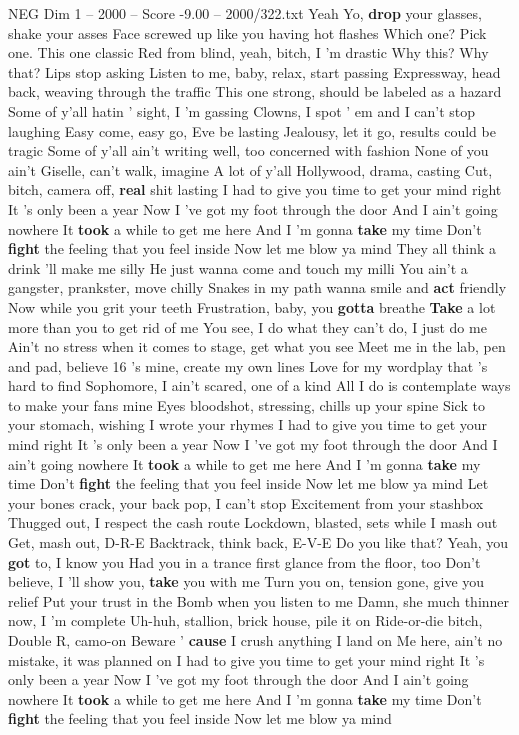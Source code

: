 \begin{textsample}{NEG Dim 1 – 2000 – Score -9.00 – 2000/322.txt}  \label{ex:f1_neg_013}
Yeah Yo, \textbf{drop} your glasses, shake your asses Face screwed up like you having hot flashes Which one?
Pick one.
This one classic Red from blind, yeah, bitch, I 'm drastic Why this?
Why that?
Lips stop asking Listen to me, baby, relax, start passing Expressway, head back, weaving through the traffic This one strong, should be labeled as a hazard Some of y'all hatin ' sight, I 'm gassing Clowns, I spot ' em and I can't stop laughing Easy come, easy go, Eve be lasting Jealousy, let it go, results could be tragic Some of y'all ain't writing well, too concerned with fashion None of you ain't Giselle, can't walk, imagine A lot of y'all Hollywood, drama, casting Cut, bitch, camera off, \textbf{real} shit lasting I had to give you time to get your mind right It 's only been a year Now I 've got my foot through the door And I ain't going nowhere It \textbf{took} a while to get me here And I 'm gonna \textbf{take} my time Don't \textbf{fight} the feeling that you feel inside Now let me blow ya mind They all think a drink 'll make me silly He just wanna come and touch my milli You ain't a gangster, prankster, move chilly Snakes in my path wanna smile and \textbf{act} friendly Now while you grit your teeth Frustration, baby, you \textbf{gotta} breathe \textbf{Take} a lot more than you to get rid of me You see, I do what they can't do, I just do me Ain't no stress when it comes to stage, get what you see Meet me in the lab, pen and pad, believe 16 's mine, create my own lines Love for my wordplay that 's hard to find Sophomore, I ain't scared, one of a kind All I do is contemplate ways to make your fans mine Eyes bloodshot, stressing, chills up your spine Sick to your stomach, wishing I wrote your rhymes I had to give you time to get your mind right It 's only been a year Now I 've got my foot through the door And I ain't going nowhere It \textbf{took} a while to get me here And I 'm gonna \textbf{take} my time Don't \textbf{fight} the feeling that you feel inside Now let me blow ya mind Let your bones crack, your back pop, I can't stop Excitement from your stashbox Thugged out, I respect the cash route Lockdown, blasted, sets while I mash out Get, mash out, D-R-E Backtrack, think back, E-V-E Do you like that?
Yeah, you \textbf{got} to, I know you Had you in a trance first glance from the floor, too Don't believe, I 'll show you, \textbf{take} you with me Turn you on, tension gone, give you relief Put your trust in the Bomb when you listen to me Damn, she much thinner now, I 'm complete Uh-huh, stallion, brick house, pile it on Ride-or-die bitch, Double R, camo-on Beware ' \textbf{cause} I crush anything I land on Me here, ain't no mistake, it was planned on I had to give you time to get your mind right It 's only been a year Now I 've got my foot through the door And I ain't going nowhere It \textbf{took} a while to get me here And I 'm gonna \textbf{take} my time Don't \textbf{fight} the feeling that you feel inside Now let me blow ya mind

\end{textsample}
